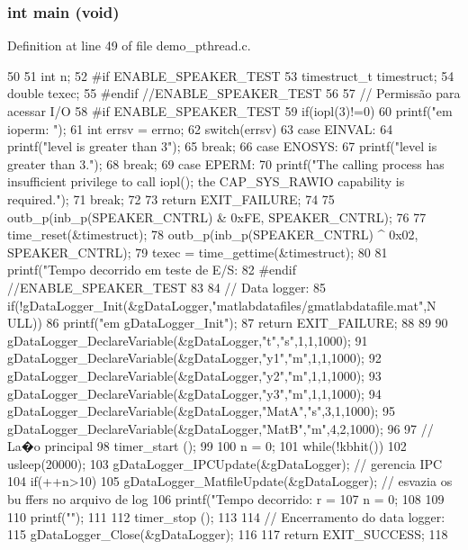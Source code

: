 \subsubsection[{main}]{\setlength{\rightskip}{0pt plus 5cm}int main (void)}\label{demo__pthread_8c_a840291bc02cba5474a4cb46a9b9566fe}


Definition at line 49 of file demo\_\-pthread.c.


\begin{DoxyCode}
50 {       
51         int n;
52 #if ENABLE_SPEAKER_TEST
53         timestruct_t timestruct;
54         double texec;
55 #endif //ENABLE_SPEAKER_TEST
56 
57         // Permissão para acessar I/O
58 #if ENABLE_SPEAKER_TEST
59         if(iopl(3)!=0){
60                 printf("\nErro em ioperm: ");
61                 int errsv = errno;
62                 switch(errsv){
63                 case EINVAL:
64                         printf("level is greater than 3");
65                         break;
66                 case ENOSYS:
67                         printf("level is greater than 3.");
68                         break;
69                 case EPERM:
70                         printf("The calling process has insufficient privilege to
       call iopl(); the CAP_SYS_RAWIO capability is required.");
71                         break;
72                 }
73                 return EXIT_FAILURE;
74         }
75         outb_p(inb_p(SPEAKER_CNTRL) & 0xFE, SPEAKER_CNTRL);
76 
77         time_reset(&timestruct);
78         outb_p(inb_p(SPEAKER_CNTRL) ^ 0x02, SPEAKER_CNTRL);
79         texec = time_gettime(&timestruct);
80 
81         printf("\n Tempo decorrido em teste de E/S: %
82 #endif //ENABLE_SPEAKER_TEST
83 
84         // Data logger:
85         if(!gDataLogger_Init(&gDataLogger,"matlabdatafiles/gmatlabdatafile.mat",N
      ULL)){
86                 printf("\nErro em gDataLogger_Init\n\n");
87                 return EXIT_FAILURE;
88         }
89 
90         gDataLogger_DeclareVariable(&gDataLogger,"t","s",1,1,1000);
91         gDataLogger_DeclareVariable(&gDataLogger,"y1","m",1,1,1000);
92         gDataLogger_DeclareVariable(&gDataLogger,"y2","m",1,1,1000);
93         gDataLogger_DeclareVariable(&gDataLogger,"y3","m",1,1,1000);
94         gDataLogger_DeclareVariable(&gDataLogger,"MatA","s",3,1,1000);
95         gDataLogger_DeclareVariable(&gDataLogger,"MatB","m",4,2,1000);
96 
97         // La�o principal
98     timer_start ();
99 
100         n = 0;
101         while(!kbhit()){
102                 usleep(20000);
103                 gDataLogger_IPCUpdate(&gDataLogger); // gerencia IPC
104                 if(++n>10){
105                         gDataLogger_MatfileUpdate(&gDataLogger); // esvazia os bu
      ffers no arquivo de log
106                         printf("\n Tempo decorrido: %
      r = %
107                         n = 0;
108                 }
109         }
110         printf("\n");
111 
112     timer_stop ();
113 
114         // Encerramento do data logger:
115         gDataLogger_Close(&gDataLogger);
116 
117     return EXIT_SUCCESS;
118 }
\end{DoxyCode}
